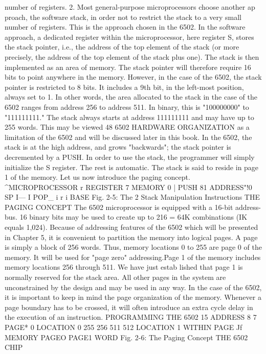 number of registers.
2. Most general-purpose microprocessors choose another ap
proach, the software stack, in order not to restrict the stack to
a very small number of registers. This is the approach chosen in
the 6502. In the software approach, a dedicated register within
the microprocessor, here register S, stores the stack pointer, i.e.,
the address of the top element of the stack (or more precisely, the
address of the top element of the stack plus one). The stack is then
implemented as an area of memory. The stack pointer will therefore
require 16 bits to point anywhere in the memory.
However, in the case of the 6502, the stack pointer is restricted
to 8 bits. It includes a 9th bit, in the left-most position, always set
to 1. In other words, the area allocated to the stack in the case of
the 6502 ranges from address 256 to address 511. In binary, this is
"100000000" to "111111111." The stack always starts at address
111111111 and may have up to 255 words. This may be viewed
48
6502 HARDWARE ORGANIZATION
as a limitation of the 6502 and will be discussed later in this book.
In the 6502, the stack is at the high address, and grows
"backwards"; the stack pointer is decremented by a PUSH.
In order to use the stack, the programmer will simply initialize
the S register. The rest is automatic.
The stack is said to reside in page 1 of the memory. Let us now
introduce the paging concept.
^MICROPROCESSOR
r REGISTER
7 MEMORY 0
| PUSH
81 ADDRESS"!0
SP I—
I POP_
i r
i
BASE
Fig. 2-5: The 2 Stack Manipulation Instructions
THE PAGING CONCEPT
The 6502 microprocessor is equipped with a 16-bit address-bus.
16 binary bits may be used to create up to 216 = 64K combinations
(IK equals 1,024). Because of addressing features of the 6502
which will be presented in Chapter 5, it is convenient to partition
the memory into logical pages. A page is simply a block of 256
words. Thus, memory locations 0 to 255 are page 0 of the memory.
It will be used for "page zero" addressing.Page 1 of the memory
includes memory locations 256 through 511. We have just estab
lished that page 1 is normally reserved for the stack area. All
other pages in the system are unconstrained by the design and
may be used in any way. In the case of the 6502, it is important to
keep in mind the page organization of the memory. Whenever a
page boundary has to be crossed, it will often introduce an extra
cycle delay in the execution of an instruction.
PROGRAMMING THE 6502
15
ADDRESS
8 7
PAGE*
0
LOCATION
0
255
256
511
512
LOCATION 1
WITHIN
PAGE Jf
MEMORY
PAGEO
PAGE1
WORD
Fig. 2-6: The Paging Concept
THE 6502 CHIP
